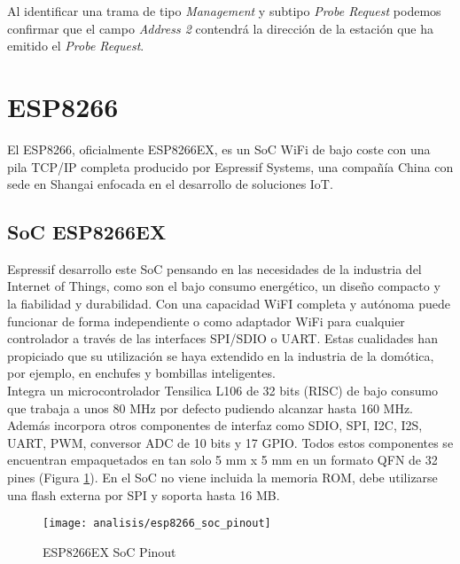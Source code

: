 \documentclass[../proyecto.tex]{subfiles}
\begin{document}
Al identificar una trama de tipo \textit{Management} y subtipo \textit{Probe Request} podemos confirmar que el campo \textit{Address 2} contendrá la dirección de la estación que ha emitido el \textit{Probe Request}.


\section{ESP8266}

El ESP8266, oficialmente ESP8266EX, es un SoC WiFi de bajo coste con una pila TCP/IP completa producido por Espressif Systems, una compañía China con sede en Shangai enfocada en el desarrollo de soluciones IoT. \cite{esp8266_overview} \\

\subsection{SoC ESP8266EX}
Espressif desarrollo este SoC pensando en las necesidades de la industria del Internet of Things, como son el bajo consumo energético, un diseño compacto y la fiabilidad y durabilidad. Con una capacidad WiFI completa y autónoma puede funcionar de forma independiente o como adaptador WiFi para cualquier controlador a través de las interfaces SPI/SDIO o UART. Estas cualidades han propiciado que su utilización se haya extendido en la industria de la domótica, por ejemplo, en enchufes y bombillas inteligentes. \\

Integra un microcontrolador Tensilica L106 de 32 bits (RISC) de bajo consumo que trabaja a unos 80 MHz por defecto pudiendo alcanzar hasta 160 MHz. Además incorpora otros componentes de interfaz como SDIO, SPI, I2C, I2S, UART, PWM, conversor ADC de 10 bits y 17 GPIO. Todos estos componentes se encuentran empaquetados en tan solo 5 mm x 5 mm en un formato QFN de 32 pines (Figura \ref{fig:esp8266_soc_pinout}). En el SoC no viene incluida la memoria ROM, debe utilizarse una flash externa por SPI y soporta hasta 16 MB. \cite{esp8266_datasheet}\\


\begin{figure}[h!]
\centering
\texttt{[image: analisis/esp8266\_soc\_pinout]}
\caption{ESP8266EX SoC Pinout}
\label{fig:esp8266_soc_pinout}
\end{figure}
\end{document}
